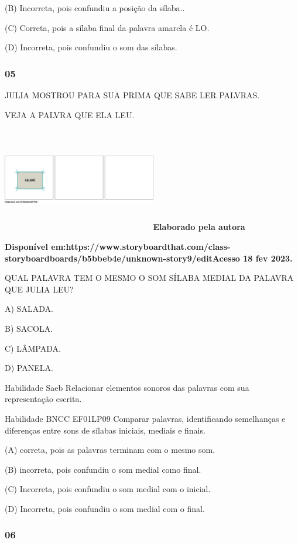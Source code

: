 (B) Incorreta, pois confundiu a posição da sílaba..

(C) Correta, pois a sílaba final da palavra amarela é LO.

(D) Incorreta, pois confundiu o som das sílabas.

\subsubsection{05}\label{section-30}

JULIA MOSTROU PARA SUA PRIMA QUE SABE LER PALVRAS.

VEJA A PALVRA QUE ELA LEU.

\includegraphics[width=2.64104in,height=1.80504in]{media/image190.png}\textbf{Elaborado
pela autora}

\textbf{Disponível
em:https://www.storyboardthat.com/class-storyboardboards/b5bbeb4e/unknown-story9/editAcesso
18 fev 2023.}

QUAL PALAVRA TEM O MESMO O SOM SÍLABA MEDIAL DA PALAVRA QUE JULIA LEU?

A) SALADA.

B) SACOLA.

C) LÂMPADA.

D) PANELA.

Habilidade Saeb Relacionar elementos sonoros das palavras com sua
representação escrita.

Habilidade BNCC EF01LP09 Comparar palavras, identificando semelhanças e
diferenças entre sons de sílabas iniciais, mediais e finais.

(A) correta, pois as palavras terminam com o mesmo som.

(B) incorreta, pois confundiu o som medial como final.

(C) Incorreta, pois confundiu o som medial com o inicial.

(D) Incorreta, pois confundiu o som medial com o final.

\subsubsection{06}\label{section-31}

